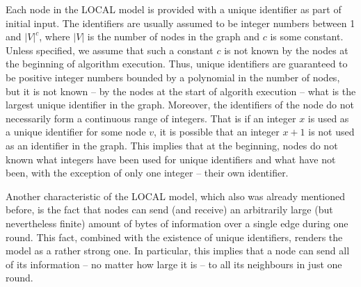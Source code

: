 Each node in the LOCAL model is provided with a unique identifier as part of initial input.
The identifiers are usually assumed to be integer numbers between 1 and $|V|^c$, where
$|V|$ is the number of nodes in the graph and $c$ is some constant. Unless specified, we
assume that such a constant $c$ is not known by the nodes at the beginning of
algorithm execution. Thus, unique identifiers are guaranteed to be positive integer
numbers bounded by a polynomial in the number of nodes, but it is not known -- by the nodes
at the start of algorith execution -- what is the largest unique identifier in the graph. Moreover,
the identifiers of the node do not necessarily form a continuous range of integers. That is
if an integer $x$ is used as a unique identifier for some node $v$, it is possible
that an integer $x+1$ is not used as an identifier in the graph. This implies that at
the beginning, nodes do not known what integers have been used for unique identifiers
and what have not been, with the exception of only one integer -- their own identifier.

Another characteristic of the LOCAL model, which also was already mentioned before, is the fact
that nodes can send (and receive) an arbitrarily large (but nevertheless finite)
amount of bytes of information over a single edge during one round. This fact,
combined with the existence of unique identifiers, renders the model as a rather strong one.
In particular, this implies that a node can send all of its information -- no matter how
large it is -- to all its neighbours in just one round.

